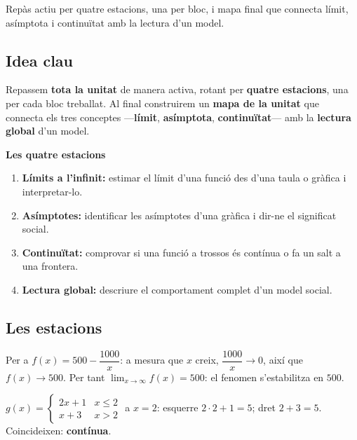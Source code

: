 %
{Repàs actiu per quatre estacions, una per bloc, i mapa final que connecta límit, asímptota i continuïtat amb la lectura d'un model.}

\subsection{Idea clau}

Repassem \textbf{tota la unitat} de manera activa, rotant per \textbf{quatre
estacions}, una per cada bloc treballat. Al final construirem un \textbf{mapa de la
unitat} que connecta els tres conceptes —\textbf{límit}, \textbf{asímptota},
\textbf{continuïtat}— amb la \textbf{lectura global} d'un model.

\begin{idea}
\textbf{Les quatre estacions}
\begin{enumerate}[leftmargin=1.6em, itemsep=2pt]
  \item \textbf{Límits a l'infinit:} estimar el límit d'una funció des d'una taula o
        gràfica i interpretar-lo.
  \item \textbf{Asímptotes:} identificar les asímptotes d'una gràfica i dir-ne el
        significat social.
  \item \textbf{Continuïtat:} comprovar si una funció a trossos és contínua o fa un
        salt a una frontera.
  \item \textbf{Lectura global:} descriure el comportament complet d'un model social.
\end{enumerate}
\end{idea}

\subsection{Les estacions}

\begin{exemple}
Per a $f(x)=500-\dfrac{1000}{x}$: a mesura que $x$ creix, $\dfrac{1000}{x}\to 0$, així
que $f(x)\to 500$. Per tant $\lim_{x\to\infty}f(x)=500$: el fenomen s'estabilitza en
$500$.
\end{exemple}

\begin{exemple}
$g(x)=\begin{cases}2x+1 & x\le 2\\ x+3 & x>2\end{cases}$ a $x=2$: esquerre
$2\cdot 2+1=5$; dret $2+3=5$. Coincideixen: \textbf{contínua}.
\end{exemple}

